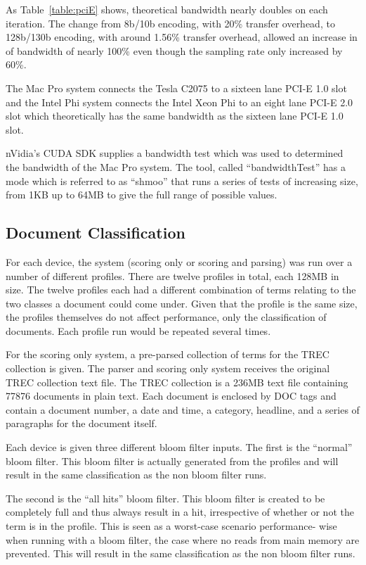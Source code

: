 As Table~\ref{table:pciE} shows, theoretical bandwidth nearly doubles on each
iteration. The change from 8b/10b encoding, with 20\% transfer overhead, to
128b/130b encoding, with around 1.56\% transfer overhead, allowed an increase in
of bandwidth of nearly 100\% even though the sampling rate only increased by
60\%.

The Mac Pro system connects the Tesla C2075 to a sixteen lane PCI-E 1.0 slot and
the Intel Phi system connects the Intel Xeon Phi to an eight lane PCI-E 2.0 slot
which theoretically has the same bandwidth as the sixteen lane PCI-E 1.0 slot.

nVidia's CUDA SDK supplies a bandwidth test which was used to determined the
bandwidth of the Mac Pro system. The tool, called ``bandwidthTest'' has a mode
which is referred to as ``shmoo'' that runs a series of tests of increasing
size, from 1KB up to 64MB to give the full range of possible values.

\subsection{Document Classification}

For each device, the system (scoring only or scoring and parsing) was run over a
number of different profiles. There are twelve profiles in total, each 128MB in
size. The twelve profiles each had a different combination of terms relating to
the two classes a document could come under. Given that the profile is the same
size, the profiles themselves do not affect performance, only the classification
of documents. Each profile run would be repeated several times.

For the scoring only system, a pre-parsed collection of terms for the TREC
collection is given. The parser and scoring only system receives the original
TREC collection text file. The TREC collection is a 236MB text file containing
77876 documents in plain text. Each document is enclosed by DOC tags and
contain a document number, a date and time, a category, headline, and a series
of paragraphs for the document itself.

Each device is given three different bloom filter inputs. The first is the
``normal'' bloom filter. This bloom filter is actually generated from the
profiles and will result in the same classification as the non bloom filter
runs.

The second is the ``all hits'' bloom filter. This bloom filter is created to be
completely full and thus always result in a hit, irrespective of whether or not
the term is in the profile. This is seen as a worst-case scenario performance-
wise when running with a bloom filter, the case where no reads from main memory
are prevented. This will result in the same classification as the non bloom
filter runs.

